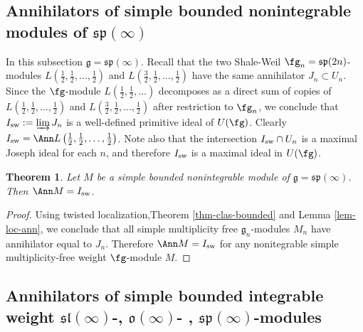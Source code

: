 \documentclass[12pt]{amsart}
\def\gg{\mathfrak{g}}
\def\gp{\mathfrak{p}}
\def\gs{\mathfrak{s}}
\newtheorem{thm}{Theorem}[section]
\begin{document}
\subsection{Annihilators of simple bounded nonintegrable modules of $\mathfrak{sp} (\infty)$}
In this subsection $\gg = \mathfrak{sp} (\infty)$. Recall that the two Shale-Weil $\fg_n=\gs\gp(2n)$-modules $L\left(\frac{1}{2}, \frac{1}{2},\dots, \frac{1}{2}\right)$ and $L\left( \frac{3}{2},  \frac{1}{2}, \dots,  \frac{1}{2}\right)$ have the same annihilator $J_n\subset U_n$. Since the $\fg$-module $L\left(\frac{1}{2}, \frac{1}{2},\dots \right)$ decomposes as a direct sum of copies of $L\left(\frac{1}{2}, \frac{1}{2},\dots, \frac{1}{2}\right)$ and $L\left( \frac{3}{2},  \frac{1}{2}, \dots,  \frac{1}{2}\right)$ after restriction to $\fg_n$, we conclude that $I_{\rm sw}:=\underrightarrow\lim\, J_n$ is a well-defined  primitive ideal of $U(\fg)$.   Clearly $I_{\rm sw}=\Ann L\left(\frac{1}{2}, \frac{1}{2},\dots, \frac{1}{2} \right)$. Note also that the intersection $I_{\rm sw}\cap U_n$ is a maximal Joseph ideal for each $n$, and therefore $I_{\rm sw}$ is a maximal ideal in $U(\fg)$. 

\begin{thm}
Let $M$ be a simple bounded nonintegrable module of  $\gg =  \mathfrak{sp} (\infty)$. Then $\Ann M = I_{\rm sw}$.
\end{thm}
\begin{proof} Using twisted localization,Theorem \ref{thm-clas-bounded} and Lemma \ref{lem-loc-ann}, we conclude that all simple multiplicity free  $\gg_n$-modules $M_n$ have   annihilator equal to $J_n$.  Therefore  $\Ann M= I_{\rm sw}$ for any nonitegrable simple multiplicity-free weight $\fg$-module $M$.  \end{proof}


\subsection{Annihilators of simple bounded integrable weight $\mathfrak{sl} (\infty)$-, $\mathfrak{o} (\infty)$- , $\mathfrak{sp} (\infty)$-modules}
\end{document}
